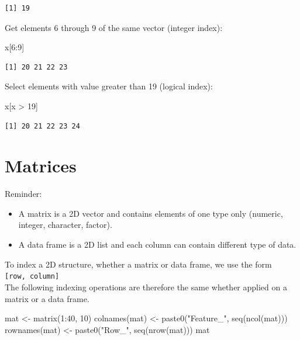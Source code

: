 \documentclass[
]{book}
\newenvironment{Shaded}{\begin{snugshade}}{\end{snugshade}}
\newcommand{\DecValTok}[1]{\textcolor[rgb]{0.00,0.00,0.81}{#1}}
\newcommand{\FunctionTok}[1]{\textcolor[rgb]{0.00,0.00,0.00}{#1}}
\newcommand{\NormalTok}[1]{#1}
\newcommand{\OtherTok}[1]{\textcolor[rgb]{0.56,0.35,0.01}{#1}}
\newcommand{\SpecialCharTok}[1]{\textcolor[rgb]{0.00,0.00,0.00}{#1}}
\newcommand{\StringTok}[1]{\textcolor[rgb]{0.31,0.60,0.02}{#1}}
\providecommand{\tightlist}{%
  \setlength{\itemsep}{0pt}\setlength{\parskip}{0pt}}
\begin{document}
\begin{verbatim}
[1] 19
\end{verbatim}

Get elements 6 through 9 of the same vector (integer index):

\begin{Shaded}
\begin{Highlighting}[]
\NormalTok{x[}\DecValTok{6}\SpecialCharTok{:}\DecValTok{9}\NormalTok{]}
\end{Highlighting}
\end{Shaded}

\begin{verbatim}
[1] 20 21 22 23
\end{verbatim}

Select elements with value greater than 19 (logical index):

\begin{Shaded}
\begin{Highlighting}[]
\NormalTok{x[x }\SpecialCharTok{\textgreater{}} \DecValTok{19}\NormalTok{]}
\end{Highlighting}
\end{Shaded}

\begin{verbatim}
[1] 20 21 22 23 24
\end{verbatim}

\hypertarget{indexmatrices}{%
\section{Matrices}\label{indexmatrices}}

Reminder:

\begin{itemize}
\tightlist
\item
  A matrix is a 2D vector and contains elements of one type only (numeric, integer, character, factor).\\
\item
  A data frame is a 2D list and each column can contain different type of data.
\end{itemize}

To index a 2D structure, whether a matrix or data frame, we use the form \texttt{{[}row,\ column{]}}\\
The following indexing operations are therefore the same whether applied on a matrix or a data frame.

\begin{Shaded}
\begin{Highlighting}[]
\NormalTok{mat }\OtherTok{\textless{}{-}} \FunctionTok{matrix}\NormalTok{(}\DecValTok{1}\SpecialCharTok{:}\DecValTok{40}\NormalTok{, }\DecValTok{10}\NormalTok{)}
\FunctionTok{colnames}\NormalTok{(mat) }\OtherTok{\textless{}{-}} \FunctionTok{paste0}\NormalTok{(}\StringTok{"Feature\_"}\NormalTok{, }\FunctionTok{seq}\NormalTok{(}\FunctionTok{ncol}\NormalTok{(mat)))}
\FunctionTok{rownames}\NormalTok{(mat) }\OtherTok{\textless{}{-}} \FunctionTok{paste0}\NormalTok{(}\StringTok{"Row\_"}\NormalTok{, }\FunctionTok{seq}\NormalTok{(}\FunctionTok{nrow}\NormalTok{(mat)))}
\NormalTok{mat}
\end{Highlighting}
\end{Shaded}
\end{document}
